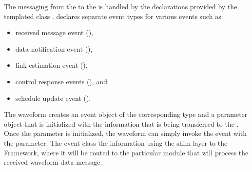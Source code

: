 The messaging from the  to the  is handled by the declarations provided by the templated class . 
 declares separate event types for various events such as 
\begin{itemize}
\item received message event (), 
\item data notification event (), 
\item link estimation event (),   %
\item control response events (), and
\item schedule update event ().
\end{itemize}
The waveform creates an event object of the corresponding type and a parameter object that is initialized with the information that is being transferred to the . 
Once the parameter is initialized, the waveform can simply invoke the event with the parameter. 
The event class the information using the shim layer to the Framework,
where it will be routed to the particular module that will process the received waveform data message. 
\fi



